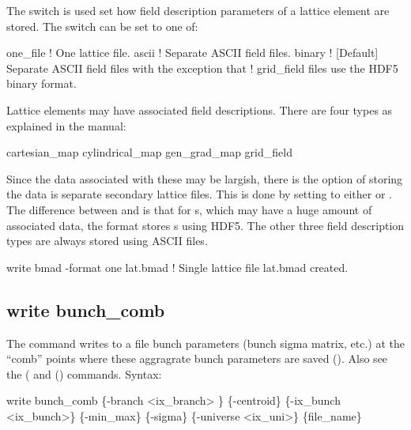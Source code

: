 {{{{{{{{{{{The  switch is used set how field description parameters of a lattice element
are stored. The  switch can be set to one of:
\begin{example}
  one_file      ! One lattice file.
  ascii         ! Separate ASCII field files.
  binary        ! [Default] Separate ASCII field files with the exception that
                !   grid_field files use the HDF5 binary format.
\end{example}
Lattice elements may have associated field descriptions. There are four types as explained in the
\bmad manual:
\begin{example}
  cartesian_map
  cylindrical_map
  gen_grad_map
  grid_field
\end{example}
Since the data associated with these may be largish, there is the option of storing the data is
separate secondary lattice files. This is done by setting  to either  or
. The difference between  and  is that for s, which
may have a huge amount of associated data, the  format stores s using
HDF5. The other three field description types are always stored using ASCII files.

\begin{example}
  write bmad -format one lat.bmad  ! Single lattice file lat.bmad created.
\end{example}


\subsection{write bunch_comb}
\label{s:write.bunch.comb}

The  command writes to a file bunch parameters (bunch sigma matrix, etc.) at
the ``comb'' points where these aggragrate bunch parameters are saved (). Also see
the  ( and  ()
commands. Syntax:
\begin{example}
    write bunch_comb \{-branch <ix_branch> \} \{-centroid\} \{-ix_bunch <ix_bunch>\} 
                        \{-min_max\} \{-sigma\} \{-universe <ix_uni>\} \{file_name\}  
\end{example}

}}}}}}}}}}}
